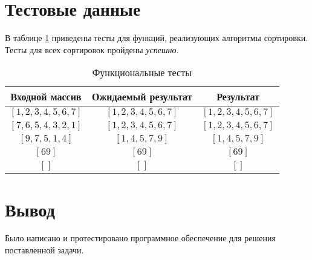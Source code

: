 \section{Тестовые данные}

В таблице \ref{tbl:functional_test} приведены тесты для функций, реализующих алгоритмы сортировки. Тесты для всех сортировок пройдены \textit{успешно}.



\begin{table}[ht!]
	\begin{center}
		\captionsetup{justification=raggedleft,singlelinecheck=off}
		\caption{\label{tbl:functional_test} Функциональные тесты}
		\begin{tabular}{|c|c|c|}
			\hline
			Входной массив & Ожидаемый результат & Результат \\ 
			\hline
			$[1, 2, 3, 4, 5, 6, 7]$ & $[1, 2, 3, 4, 5, 6, 7]$  & $[1, 2, 3, 4, 5, 6, 7]$\\
			$[7, 6, 5, 4, 3, 2, 1]$  & $[1, 2, 3, 4, 5, 6, 7]$ & $[1, 2, 3, 4, 5, 6, 7]$\\
			$[9, 7, 5, 1, 4]$  & $[1, 4, 5, 7, 9]$  & $[1, 4, 5, 7, 9]$\\
			$[69]$  & $[69]$  & $[69]$\\
			$[]$  & $[]$  & $[]$\\
			\hline
		\end{tabular}
	\end{center}
\end{table}

\section*{Вывод}
Было написано и протестировано программное обеспечение для решения поставленной задачи.
